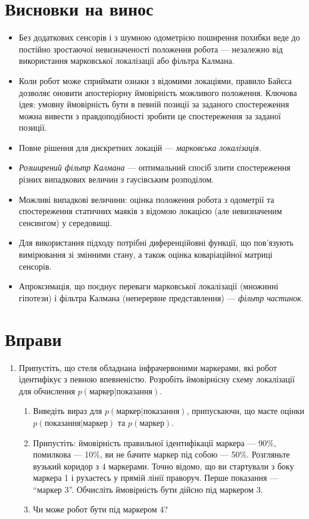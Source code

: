 \section*{Висновки на винос}
\begin{itemize}
\item Без додаткових сенсорів і з шумною одометрією поширення похибки веде до постійно зростаючої невизначеності положення робота — незалежно від використання марковської локалізації або фільтра Калмана.
\item Коли робот може сприймати ознаки з відомими локаціями, правило Байєса дозволяє оновити апостеріорну ймовірність можливого положення. Ключова ідея: умовну ймовірність бути в певній позиції за заданого спостереження можна вивести з правдоподібності зробити це спостереження за заданої позиції.
\item Повне рішення для дискретних локацій — \emph{марковська локалізація}.
\item \emph{Розширений фільтр Калмана} — оптимальний спосіб злити спостереження різних випадкових величин з гаусівським розподілом.
\item Можливі випадкові величини: оцінка положення робота з одометрії та спостереження статичних маяків з відомою локацією (але невизначеним сенсингом) у середовищі.
\item Для використання підходу потрібні диференційовні функції, що пов'язують вимірювання зі змінними стану, а також оцінка коваріаційної матриці сенсорів.
\item Апроксимація, що поєднує переваги марковської локалізації (множинні гіпотези) і фільтра Калмана (неперервне представлення) — \emph{фільтр частинок}.
\end{itemize}

\section*{Вправи}\small
\begin{enumerate}
\item Припустіть, що стеля обладнана інфрачервоними маркерами, які робот ідентифікує з певною впевненістю. Розробіть ймовірнісну схему локалізації для обчислення $p(\text{маркер}|\text{показання})$.
\begin{enumerate}
\item Виведіть вираз для $p(\text{маркер}|\text{показання})$, припускаючи, що маєте оцінки $p(\text{показання}|\text{маркер})$ та $p(\text{маркер})$.
\item Припустіть: ймовірність правильної ідентифікації маркера — 90\%, помилкова — 10\%, ви не бачите маркер під собою — 50\%. Розгляньте вузький коридор з 4 маркерами. Точно відомо, що ви стартували з боку маркера 1 і рухаєтесь у прямій лінії праворуч. Перше показання — ``маркер 3''. Обчисліть ймовірність бути дійсно під маркером 3.
\item Чи може робот бути під маркером 4?
\end{enumerate}
\end{enumerate}\normalsize
